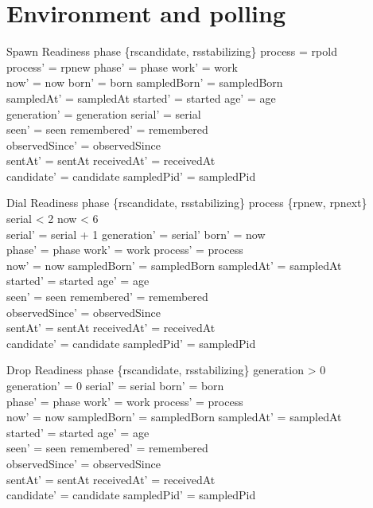 \documentclass[a4paper,10pt,fleqn]{article}
\begin{document}
\section{Environment and polling}
\begin{schema}{Spawn}
  \Delta Readiness
\where
  phase \in \{rscandidate, rsstabilizing\} \land process = rpold \\
  process' = rpnew \land phase' = phase \land work' = work \\
  now' = now \land born' = born \land sampledBorn' = sampledBorn \\
  sampledAt' = sampledAt \land started' = started \land age' = age \\
  generation' = generation \land serial' = serial \\
  seen' = seen \land remembered' = remembered \\
  observedSince' = observedSince \\
  sentAt' = sentAt \land receivedAt' = receivedAt \\
  candidate' = candidate \land sampledPid' = sampledPid
\end{schema}
\begin{schema}{Dial}
  \Delta Readiness
\where
  phase \in \{rscandidate, rsstabilizing\} \land process \in \{rpnew, rpnext\} \\
  serial < 2 \land now < 6 \\
  serial' = serial + 1 \land generation' = serial' \land born' = now \\
  phase' = phase \land work' = work \land process' = process \\
  now' = now \land sampledBorn' = sampledBorn \land sampledAt' = sampledAt \\
  started' = started \land age' = age \\
  seen' = seen \land remembered' = remembered \\
  observedSince' = observedSince \\
  sentAt' = sentAt \land receivedAt' = receivedAt \\
  candidate' = candidate \land sampledPid' = sampledPid
\end{schema}
\begin{schema}{Drop}
  \Delta Readiness
\where
  phase \in \{rscandidate, rsstabilizing\} \land generation > 0 \\
  generation' = 0 \land serial' = serial \land born' = born \\
  phase' = phase \land work' = work \land process' = process \\
  now' = now \land sampledBorn' = sampledBorn \land sampledAt' = sampledAt \\
  started' = started \land age' = age \\
  seen' = seen \land remembered' = remembered \\
  observedSince' = observedSince \\
  sentAt' = sentAt \land receivedAt' = receivedAt \\
  candidate' = candidate \land sampledPid' = sampledPid
\end{schema}
\end{document}
